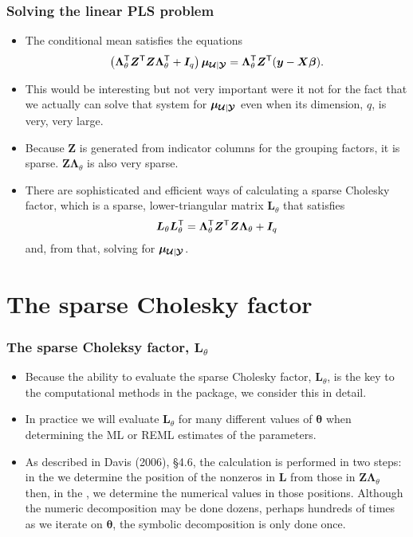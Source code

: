 \documentclass[dvipsnames,pdflatex,beamer]{beamer}
\newcommand{\bLt}{\ensuremath{\bm\Lambda_\theta}}
\begin{document}
\begin{frame}
  \frametitle{Solving the linear PLS problem}
  \begin{itemize}
  \item The conditional mean satisfies the equations
    \begin{displaymath}
      \left(\bLt\trans\bm Z\trans\bm Z\bLt\trans+\bm I_q\right)
      \bm\mu_{\bc U|\bc Y}=\bLt\trans\bm Z\trans(\bm y-\bm X\bm\beta) .
    \end{displaymath}
  \item This would be interesting but not very important were it not
    for the fact that we actually can solve that system for
    $\bm\mu_{\bm{\mathcal{U}}|\bm{\mathcal{Y}}}$ even when its dimension, $q$, is
    very, very large.
  \item Because $\bm Z$ is generated from indicator columns for the
    grouping factors, it is sparse.  $\bm Z\bLt$ is also very sparse.
  \item There are sophisticated and efficient ways of calculating a
    sparse Cholesky factor, which is a sparse, lower-triangular matrix
    $\bm L_\theta$ that satisfies
    \begin{displaymath}
      \bm L_\theta\bm L\trans_\theta=
      \bLt\trans\bm Z\trans\bm Z\bLt+\bm I_q
    \end{displaymath}
    and, from that, solving for $\bm\mu_{\bm{\mathcal{U}}|\bm{\mathcal{Y}}}$.
  \end{itemize}
\end{frame}
\section[Cholesky]{The sparse Cholesky factor}

\begin{frame}
  \frametitle{The sparse Choleksy factor, $\bm L_\theta$}
  \begin{itemize}
  \item Because the ability to evaluate the sparse Cholesky factor,
    $\bm L_\theta$, is the key to the computational methods in the
     package, we consider this in detail.
  \item In practice we will evaluate $\bm L_\theta$ for many
    different values of $\bm\theta$ when determining the ML or REML
    estimates of the parameters.
  \item As described in Davis (2006), \S4.6, the calculation is
    performed in two steps: in the  we
    determine the position of the nonzeros in $\bm L$ from those in
    $\bm Z\bLt$ then, in the , we determine
    the numerical values in those positions.  Although the
    numeric decomposition may be done dozens, perhaps hundreds
    of times as we iterate on $\bm\theta$, the symbolic decomposition is
    only done once.
  \end{itemize}
\end{frame}
\end{document}
